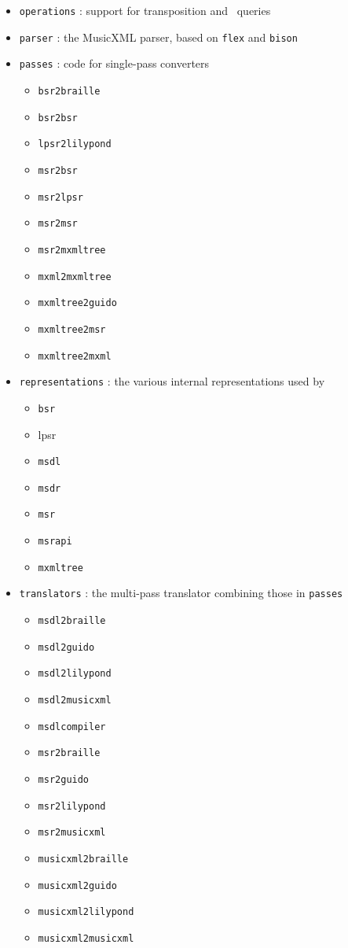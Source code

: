 \begin{itemize}
\item {\tt operations} : support for transposition and \mxml\ queries

\item {\tt parser} : the MusicXML parser, based on {\tt flex} and {\tt bison}

\item {\tt passes} : code for single-pass converters

  \begin{itemize}
  \item {\tt bsr2braille}
  \item {\tt bsr2bsr}
  \item {\tt lpsr2lilypond}
  \item {\tt msr2bsr}
  \item {\tt msr2lpsr}
  \item {\tt msr2msr}
  \item {\tt msr2mxmltree}
  \item {\tt mxml2mxmltree}
  \item {\tt mxmltree2guido}
  \item {\tt mxmltree2msr}
  \item {\tt mxmltree2mxml}
  \end{itemize}

\item {\tt representations} : the various internal representations used by \lib\

  \begin{itemize}
  \item {\tt bsr}
  \item {lpsr}
  \item {\tt msdl}
  \item {\tt msdr}
  \item {\tt msr}
  \item {\tt msrapi}
  \item {\tt mxmltree}
  \end{itemize}

\item {\tt translators} : the multi-pass translator combining those in {\tt passes}

  \begin{itemize}
  \item {\tt msdl2braille}
  \item {\tt msdl2guido}
  \item {\tt msdl2lilypond}
  \item {\tt msdl2musicxml}
  \item {\tt msdlcompiler}
  \item {\tt msr2braille}
  \item {\tt msr2guido}
  \item {\tt msr2lilypond}
  \item {\tt msr2musicxml}
  \item {\tt musicxml2braille}
  \item {\tt musicxml2guido}
  \item {\tt musicxml2lilypond}
  \item {\tt musicxml2musicxml}
  \end{itemize}


\end{itemize}
